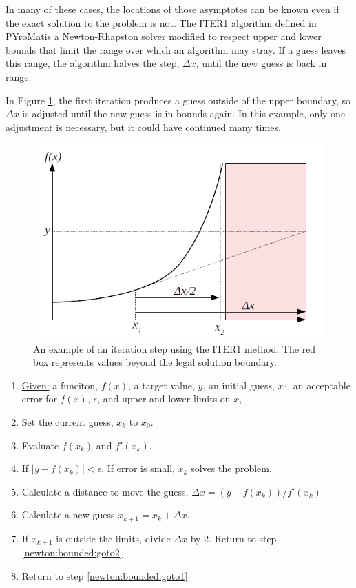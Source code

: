 \documentclass{article}
\def\pm{PYroMat}
\begin{document}
In many of these cases, the locations of those asymptotes can be known even if the exact solution to the problem is not.  The ITER1 algorithm defined in \pm is a Newton-Rhapston solver modified to respect upper and lower bounds that limit the range over which an algorithm may stray.  If a guess leaves this range, the algorithm halves the step, $\Delta x$, until the new guess is back in range.

In Figure \ref{fig:1d:newton:bounded}, the first iteration produces a guess outside of the upper boundary, so $\Delta x$ is adjusted until the new guess is in-bounds again.  In this example, only one adjustment is necessary, but it could have continued many times.

\begin{figure}
\centering
\includegraphics[width = 0.8\linewidth]{figures/1d_newton_bounded}
\caption{An example of an iteration step using the ITER1 method.  The red box represents values beyond the legal solution boundary.}\label{fig:1d:newton:bounded}
\end{figure}

\begin{enumerate}
\item \underline{Given:} a funciton, $f(x)$, a target value, $y$, an initial guess, $x_0$, an acceptable error for $f(x)$, $\epsilon$, and upper and lower limits on $x$,
\item Set the current guess, $x_k$ to $x_0$.
\item Evaluate $f(x_k)$ and $f'(x_k)$. \label{newton:bounded:goto1}
\item If $|y-f(x_k)| < \epsilon$.  If error is small, $x_k$ solves the problem.
\item Calculate a distance to move the guess, $\Delta x = (y - f(x_k))/f'(x_k)$
\item Calculate a new guess $x_{k+1} = x_k + \Delta x$.\label{newton:bounded:goto2}
\item If $x_{k+1}$ is outside the limits, divide $\Delta x$ by 2. Return to step \ref{newton:bounded:goto2}
\item Return to step \ref{newton:bounded:goto1}
\end{enumerate}
\end{document}
